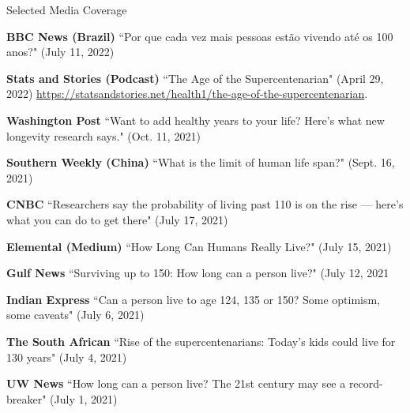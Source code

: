 \documentclass{resume} %
\begin{document}
\begin{rSection}{Selected Media Coverage}

\small{

{\bf BBC News (Brazil)} ``Por que cada vez mais pessoas est\~{a}o vivendo at\'{e} os 100 anos?" (July 11, 2022)

{\bf Stats and Stories (Podcast)} ``The Age of the Supercentenarian" (April 29, 2022) \url{https://statsandstories.net/health1/the-age-of-the-supercentenarian}.

{\bf Washington Post} ``Want to add healthy years to your life? Here’s what new longevity research says." (Oct. 11, 2021)

{\bf Southern Weekly (China)} ``What is the limit of human life span?" (Sept. 16, 2021)

{\bf CNBC} ``Researchers say the probability of living past 110 is on the rise — here’s what you can do to get there" (July 17, 2021)

{\bf Elemental (Medium)} ``How Long Can Humans Really Live?" (July 15, 2021)

{\bf Gulf News} ``Surviving up to 150: How long can a person live?" (July 12, 2021

{\bf Indian Express} ``Can a person live to age 124, 135 or 150? Some optimism, some caveats" (July 6, 2021)

{\bf The South African} ``Rise of the supercentenarians: Today’s kids could live for 130 years" (July 4, 2021)

{\bf UW News} ``How long can a person live? The 21st century may see a record-breaker" (July 1, 2021)
}

\end{rSection}
\end{document}
